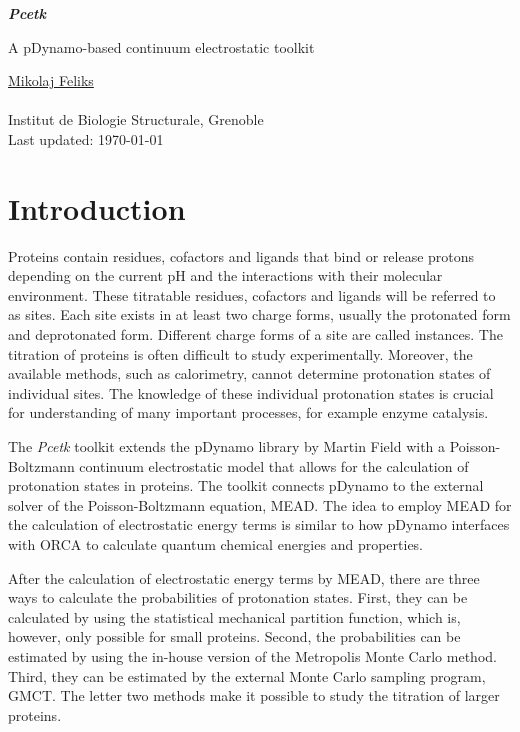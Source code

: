 \documentclass[12pt]{article}
\newcommand{\modulename}{\textit{Pcetk}\xspace}
\begin{document}
\begin{center}
{\LARGE \bf \modulename}

{\normalsize
A pDynamo-based continuum electrostatic toolkit

\vspace{1.0cm}
\underline{Mikolaj Feliks}\\
\\
Institut de Biologie Structurale, Grenoble\\

Last updated: \today
}

\vspace{0.5cm}
\end{center}


\section{Introduction}
Proteins contain residues, cofactors and ligands that bind or release protons
depending on the current pH and the interactions with their molecular
environment\cite{Ullmann1999}.
%
These titratable residues, cofactors and ligands will be referred to as sites.
%
Each site exists in at least two charge forms, usually the protonated form and
deprotonated form.
%
Different charge forms of a site are called instances.
%
The titration of proteins is often difficult to study experimentally.
%
Moreover,
the available methods, such as calorimetry, cannot determine protonation states
of individual sites.
%
The knowledge of these individual protonation states is crucial for
understanding of many important processes, for example enzyme catalysis\cite{Bombarda2010}.


The \modulename toolkit extends the pDynamo library by
Martin Field\cite{pDynamo_Field2008}  with a Poisson-Boltz\-mann continuum electrostatic
model that allows for the calculation of protonation states
in proteins\cite{Bashford1992,Ullmann1999,Bombarda2006}.
%
The toolkit
connects pDynamo to the external solver of the Poisson-Boltzmann
equation, MEAD\cite{Bashford1997}.
%
The idea to employ MEAD for the calculation of electrostatic energy terms
is similar to how pDynamo interfaces with ORCA to calculate
quantum chemical energies and properties.
%

After the calculation of electrostatic energy terms by MEAD,
there are three ways to calculate the probabilities of protonation states.
%
First,
they can be calculated by using the statistical mechanical partition function,
which is, however, only possible for small proteins.
%
Second,
the probabilities can be estimated by using the in-house version of
the Metropolis Monte Carlo method\cite{Beroza1991}.
%
Third,
they can be estimated by the external Monte Carlo sampling program,
GMCT\cite{Ullmann2012,Thomas_PhD}.
%
The letter two methods make it possible to study the titration
of larger proteins.
\end{document}
